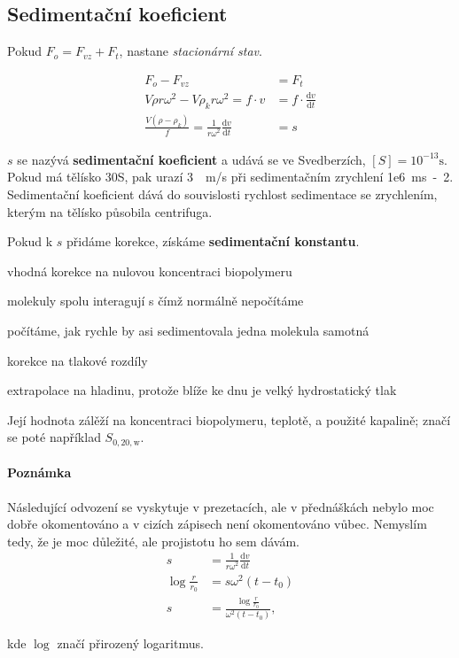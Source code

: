 \documentclass[DIV=8]{scrreprt}
\newcommand{\mybox}[2]{
    \paragraph{#1} #2
}
\begin{document}
\subsection{Sedimentační koeficient} \label{Sedimentační koeficient}


Pokud \(F_o = F_{vz} + F_t\), nastane \emph{stacionární stav}.

\begin{align*}F_o - F_{vz} &= F_t \\
V \rho r  \omega^2 - V  \rho_k  r  \omega^2 = f \cdot v &= f \cdot \frac{\text{d}v}{\text{d}t} \\
\frac{V (\rho - \rho_k)}{f} = \frac{1}{r \omega^2} \frac{\text{d}v}{\text{d}t} &= s\end{align*}


\(s\) se nazývá \textbf{sedimentační koeficient} a udává se ve Svedberzích, \([S] = 10^{-13}\text{s}\). Pokud má tělísko 30S, pak urazí \si{3 \mu m/s} při sedimentačním zrychlení \si{1e6 ms-2}. Sedimentační koeficient dává do souvislosti rychlost sedimentace se zrychlením, kterým na tělísko působila centrifuga.

Pokud k \(s\) přidáme korekce, získáme \textbf{sedimentační konstantu}.
\begin{myEnumerate}[nosep]
    \item vhodná korekce na nulovou koncentraci biopolymeru
\begin{myItemize}[nosep]
    \item molekuly spolu interagují s čímž normálně nepočítáme
    \item počítáme, jak rychle by asi sedimentovala jedna molekula samotná
\end{myItemize}

    \item korekce na tlakové rozdíly
\begin{myItemize}[nosep]
    \item extrapolace na hladinu, protože blíže ke dnu je velký hydrostatický tlak
\end{myItemize}

\end{myEnumerate}


Její hodnota zálěží na koncentraci biopolymeru, teplotě, a použité kapalině; značí se poté například \(S_{0, 20, \text{w}}\).

\mybox{Poznámka}{Následující odvození se vyskytuje v prezetacích, ale v přednáškách nebylo moc dobře okomentováno a v cizích zápisech není okomentováno vůbec. Nemyslím tedy, že je moc důležité, ale projistotu ho sem dávám.
\begin{align*}s &= \frac{1}{r \omega^2} \frac{\text{d}v}{\text{d}t} \\
\log \frac{r}{r_0} &= s \omega^2 (t - t_0) \\
s & = \frac{\log \frac{r}{r_0}}{\omega^2 (t - t_0)},\end{align*}

kde \(\log\) značí přirozený logaritmus.}
\end{document}
